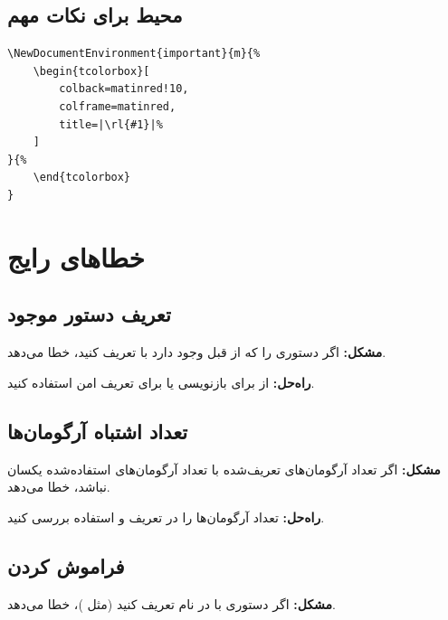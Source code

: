 \subsection{محیط برای نکات مهم}
\label{sec:custom-commands-important}

\begin{latin}
\begin{verbatim}
\NewDocumentEnvironment{important}{m}{%
    \begin{tcolorbox}[
        colback=matinred!10,
        colframe=matinred,
        title=|\rl{#1}|%
    ]
}{%
    \end{tcolorbox}
}
\end{verbatim}
\end{latin}


\section{خطاهای رایج}
\label{sec:custom-commands-mistakes}

\subsection{تعریف دستور موجود}
\label{sec:custom-commands-mistake-exists}

\textbf{مشکل:} اگر دستوری را که از قبل
وجود دارد با  تعریف کنید،
خطا می‌دهد.

\textbf{راه‌حل:} از  برای
بازنویسی یا  برای
تعریف امن استفاده کنید.

\subsection{تعداد اشتباه آرگومان‌ها}
\label{sec:custom-commands-mistake-args}

\textbf{مشکل:} اگر تعداد آرگومان‌های تعریف‌شده
با تعداد آرگومان‌های استفاده‌شده یکسان
نباشد، خطا می‌دهد.

\textbf{راه‌حل:} تعداد آرگومان‌ها را در
تعریف و استفاده بررسی کنید.

\subsection{فراموش کردن }
\label{sec:custom-commands-mistake-makeatletter}

\textbf{مشکل:} اگر دستوری با  در نام
تعریف کنید (مثل )،
 خطا می‌دهد.

